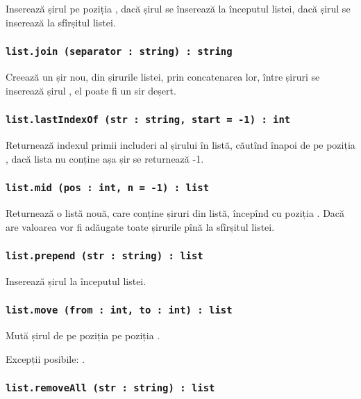 Inserează șirul  pe poziția , dacă  șirul se înserează la începutul listei, dacă  șirul se inserează la sfîrșitul listei.

\subsubsection{\lstinline|list.join (separator : string) : string|}

Creează un șir nou, din șirurile listei, prin concatenarea lor, între șiruri se inserează șirul , el poate fi un sir deșert.

\subsubsection{\lstinline|list.lastIndexOf (str : string, start = -1) : int|}

Returnează indexul primii includeri al șirului  în listă, căutînd înapoi de pe poziția , dacă lista nu conține așa șir se returnează -1.

\subsubsection{\lstinline|list.mid (pos : int, n = -1) : list|}

Returnează o listă nouă, care conține  șiruri din listă, începînd cu poziția . Dacă  are valoarea  vor fi adăugate toate șirurile pînă la sfîrșitul listei.

\subsubsection{\lstinline|list.prepend (str : string) : list|}

Inserează șirul  la începutul listei.

\subsubsection{\lstinline|list.move (from : int, to : int) : list|}

Mută șirul de pe poziția  pe poziția .

Excepții posibile: .

\subsubsection{\lstinline|list.removeAll (str : string) : list|}

